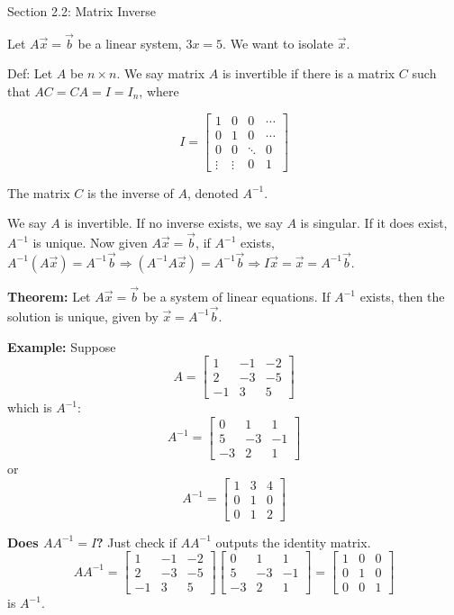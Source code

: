 \documentclass{article}
\begin{document}
Section 2.2: Matrix Inverse

Let \( A\vec{x} = \vec{b} \) be a linear system, \( 3x = 5 \). We want to isolate \( \vec{x} \).

Def: Let \( A \) be \( n \times n \). We say matrix \( A \) is invertible if there is a matrix \( C \) such that \( AC = CA = I = I_n \), where

\[ I = \begin{bmatrix} 1 & 0 & 0 & \cdots \\ 0 & 1 & 0 & \cdots \\ 0 & 0 & \ddots & 0 \\ \vdots & \vdots & 0 & 1 \end{bmatrix} \]

The matrix \( C \) is the inverse of \( A \), denoted \( A^{-1} \).

We say \( A \) is invertible. If no inverse exists, we say \( A \) is singular. If it does exist, \( A^{-1} \) is unique. Now given \( A\vec{x} = \vec{b} \), if \( A^{-1} \) exists, \( A^{-1}(A\vec{x}) = A^{-1}\vec{b} \Rightarrow (A^{-1}A\vec{x}) = A^{-1}\vec{b} \Rightarrow I\vec{x} = \vec{x} = A^{-1}\vec{b} \).

\textbf{Theorem:} Let \( A\vec{x} = \vec{b} \) be a system of linear equations. If \( A^{-1} \) exists, then the solution is unique, given by \( \vec{x} = A^{-1}\vec{b} \).

\textbf{Example:} Suppose 
\[ 
A = \begin{bmatrix} 
1 & -1 & -2 \\ 
2 & -3 & -5 \\ 
-1 & 3 & 5 
\end{bmatrix} 
\]
which is \( A^{-1} \): 
\[ 
A^{-1} = \begin{bmatrix} 
0 & 1 & 1 \\ 
5 & -3 & -1 \\ 
-3 & 2 & 1 
\end{bmatrix} 
\]
or 
\[ 
A^{-1} = \begin{bmatrix} 
1 & 3 & 4 \\ 
0 & 1 & 0 \\ 
0 & 1 & 2 
\end{bmatrix} 
\]

\textbf{Does \( AA^{-1} = I \)?} Just check if \( AA^{-1} \) outputs the identity matrix. 
\[ 
AA^{-1} = \begin{bmatrix} 
1 & -1 & -2 \\ 
2 & -3 & -5 \\ 
-1 & 3 & 5 
\end{bmatrix} 
\begin{bmatrix} 
0 & 1 & 1 \\ 
5 & -3 & -1 \\ 
-3 & 2 & 1 
\end{bmatrix} 
= \begin{bmatrix} 
1 & 0 & 0 \\ 
0 & 1 & 0 \\ 
0 & 0 & 1 
\end{bmatrix} 
\]
is \( A^{-1} \).
\end{document}
